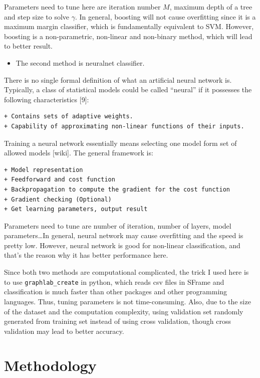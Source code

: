 \documentclass[]{article}
\begin{document}
Parameters need to tune here are iteration number \(M\), maximum depth
of a tree and step size to solve \(\gamma\). In general, boosting will
not cause overfitting since it is a maximum margin classifier, which is
fundamentally equivalent to SVM. However, boosting is a non-parametric,
non-linear and non-binary method, which will lead to better result.

\begin{itemize}
\itemsep1pt\parskip0pt
\item
  The second method is neuralnet classifier.
\end{itemize}

There is no single formal definition of what an artificial neural
network is. Typically, a class of statistical models could be called
``neural'' if it possesses the following characteristics {[}9{]}:

\begin{verbatim}
+ Contains sets of adaptive weights. 
+ Capability of approximating non-linear functions of their inputs.
\end{verbatim}

Training a neural network essentially means selecting one model form set
of allowed models {[}wiki{]}. The general framework is:

\begin{verbatim}
+ Model representation
+ Feedforward and cost function
+ Backpropagation to compute the gradient for the cost function
+ Gradient checking (Optional)
+ Get learning parameters, output result
\end{verbatim}

Parameters need to tune are number of iteration, number of layers, model
parameters\ldots{}In general, neural network may cause overfitting and
the speed is pretty low. However, neural network is good for non-linear
classification, and that's the reason why it has better performance
here.

Since both two methods are computational complicated, the trick I used
here is to use \texttt{graphlab\_create} in python, which reads csv
files in SFrame and classification is much faster than other packages
and other programming languages. Thus, tuning parameters is not
time-consuming. Also, due to the size of the dataset and the computation
complexity, using validation set randomly generated from training set
instead of using cross validation, though cross validation may lead to
better accuracy.

\section{Methodology}\label{methodology}
\end{document}

